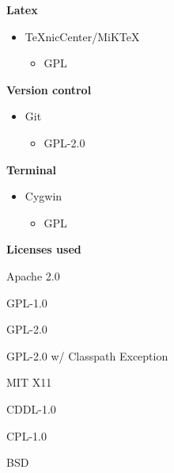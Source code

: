 	{\bf Latex}
		\begin{itemize}
			\item TeXnicCenter/MiKTeX\cite{bib:lli}
				\begin{itemize}
					\item GPL
				\end{itemize}
		\end{itemize}
	{\bf Version control}
		\begin{itemize}
			\item Git\cite{bib:gili}
				\begin{itemize}
					\item GPL-2.0
				\end{itemize}
		\end{itemize}
	{\bf Terminal}
		\begin{itemize}
			\item Cygwin\cite{bib:cli}
				\begin{itemize}
					\item GPL
				\end{itemize}
		\end{itemize}

	{\bf Licenses used}
	\begin{description}
		\item[Apache 2.0] \cite{bib:apli}
		\item[GPL-1.0] \cite{bib:gpl1}
		\item[GPL-2.0] \cite{bib:gpl2}
		\item[GPL-2.0 w/ Classpath Exception] \cite{bib:gplw}
		\item[MIT X11]  \cite{bib:mit}
		\item[CDDL-1.0]  \cite{bib:cddl}
		\item[CPL-1.0]  \cite{bib:cpl}
		\item[BSD]  \cite{bib:bsd}
	\end{description}

